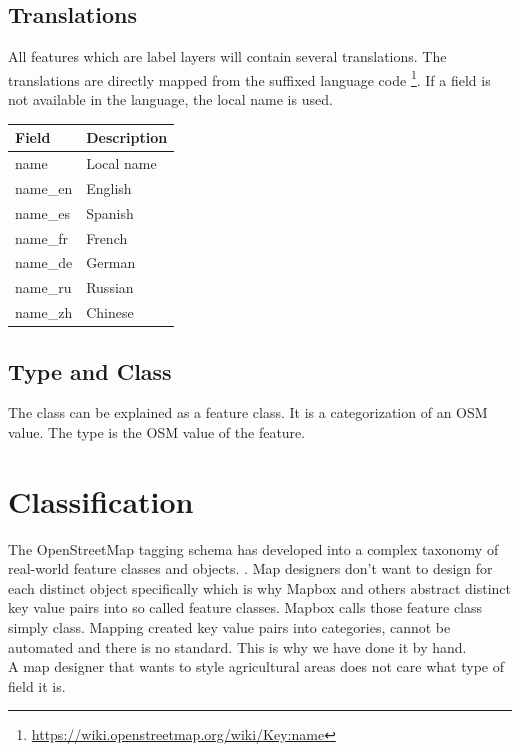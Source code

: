 \subsection{Translations}
All features which are label layers will contain several translations.
The translations are directly mapped from the suffixed language code \footnote{\url{https://wiki.openstreetmap.org/wiki/Key:name}}. If a field is not available in the language, the local name is used.

\begin{flushleft}
    \begin{tabular}{ll}
    \hline
     Field    & 	Description                                    \\
    \hline
    name      & Local name  \\
    name\_en	 & English                          \\
    name\_es	 & Spanish                          \\
    name\_fr	 & French                           \\
    name\_de	 & German                           \\
    name\_ru	 & Russian                          \\
    name\_zh	 & Chinese                          \\
    \end{tabular}
\end{flushleft}

\subsection{Type and Class}
The class can be explained as a feature class. It is a categorization of an OSM value.
The type is the OSM value of the feature.

\section{Classification}
\label{classification}

The OpenStreetMap tagging schema has developed into a complex taxonomy of real-world feature classes and objects. \cite[p. 15]{haklay2008openstreetmap}. Map designers don't want to design
for each distinct object specifically which is why Mapbox and others abstract distinct key value pairs into so called feature classes. Mapbox calls those feature class simply class. Mapping created key value pairs into categories, cannot be automated
and there is no standard. This is why we have done it by hand.
\\
A map designer that wants to style agricultural areas does not care
what type of field it is.

